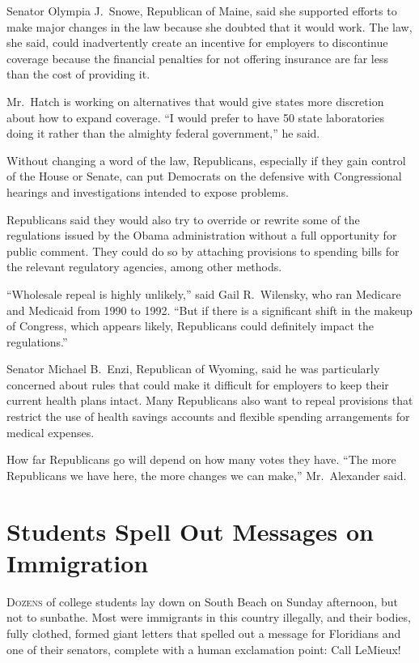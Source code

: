 ﻿\documentclass[12pt]{article}
\begin{document}
Senator Olympia J.~Snowe, Republican of Maine, said she supported efforts to make major changes in
the law because she doubted that it would work. The law, she said, could inadvertently create an
incentive for employers to discontinue coverage because the financial penalties for not offering
insurance are far less than the cost of providing it.

Mr.~Hatch is working on alternatives that would give states more discretion about how to expand
coverage. ``I would prefer to have 50 state laboratories doing it rather than the almighty federal
government,'' he said.

Without changing a word of the law, Republicans, especially if they gain control of the House or
Senate, can put Democrats on the defensive with Congressional hearings and investigations intended
to expose problems.

Republicans said they would also try to override or rewrite some of the regulations issued by the
Obama administration without a full opportunity for public comment. They could do so by attaching
provisions to spending bills for the relevant regulatory agencies, among other methods.

``Wholesale repeal is highly unlikely,'' said Gail R.~Wilensky, who ran Medicare and Medicaid from
1990 to 1992. ``But if there is a significant shift in the makeup of Congress, which appears likely,
Republicans could definitely impact the regulations.''

Senator Michael B.~Enzi, Republican of Wyoming, said he was particularly concerned about rules that
could make it difficult for employers to keep their current health plans intact. Many Republicans
also want to repeal provisions that restrict the use of health savings accounts and flexible
spending arrangements for medical expenses.

How far Republicans go will depend on how many votes they have. ``The more Republicans we have here,
the more changes we can make,'' Mr.~Alexander said.

\pagebreak
\section{Students Spell Out Messages on Immigration}

\lettrine{D}{ozens} of college students lay down on South Beach on Sunday
afternoon, but not to sunbathe. Most were immigrants in this country illegally, and their bodies,
fully clothed, formed giant letters that spelled out a message for Floridians and one of their
senators, complete with a human exclamation point: Call LeMieux!
\end{document}

